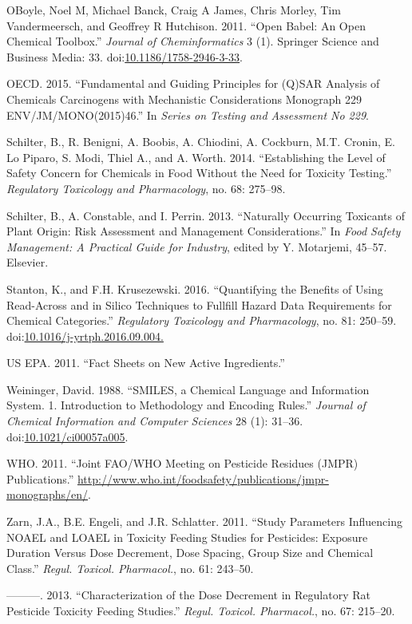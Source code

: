 \documentclass[]{achemso}
\begin{document}
\hypertarget{ref-OBoyle2011}{}
OBoyle, Noel M, Michael Banck, Craig A James, Chris Morley, Tim
Vandermeersch, and Geoffrey R Hutchison. 2011. ``Open Babel: An Open
Chemical Toolbox.'' \emph{Journal of Cheminformatics} 3 (1). Springer
Science and Business Media: 33.
doi:\href{https://doi.org/10.1186/1758-2946-3-33}{10.1186/1758-2946-3-33}.

\hypertarget{ref-OECD2015}{}
OECD. 2015. ``Fundamental and Guiding Principles for (Q)SAR Analysis of
Chemicals Carcinogens with Mechanistic Considerations Monograph 229
ENV/JM/MONO(2015)46.'' In \emph{Series on Testing and Assessment No
229}.

\hypertarget{ref-Schilter2014}{}
Schilter, B., R. Benigni, A. Boobis, A. Chiodini, A. Cockburn, M.T.
Cronin, E. Lo Piparo, S. Modi, Thiel A., and A. Worth. 2014.
``Establishing the Level of Safety Concern for Chemicals in Food Without
the Need for Toxicity Testing.'' \emph{Regulatory Toxicology and
Pharmacology}, no. 68: 275--98.

\hypertarget{ref-Schilter2013}{}
Schilter, B., A. Constable, and I. Perrin. 2013. ``Naturally Occurring
Toxicants of Plant Origin: Risk Assessment and Management
Considerations.'' In \emph{Food Safety Management: A Practical Guide for
Industry}, edited by Y. Motarjemi, 45--57. Elsevier.

\hypertarget{ref-Stanton2016}{}
Stanton, K., and F.H. Krusezewski. 2016. ``Quantifying the Benefits of
Using Read-Across and in Silico Techniques to Fullfill Hazard Data
Requirements for Chemical Categories.'' \emph{Regulatory Toxicology and
Pharmacology}, no. 81: 250--59.
doi:\href{https://doi.org/10.1016/j-yrtph.2016.09.004.}{10.1016/j-yrtph.2016.09.004.}

\hypertarget{ref-EPA2011}{}
US EPA. 2011. ``Fact Sheets on New Active Ingredients.''

\hypertarget{ref-doi:10.1021ux2fci00057a005}{}
Weininger, David. 1988. ``SMILES, a Chemical Language and Information
System. 1. Introduction to Methodology and Encoding Rules.''
\emph{Journal of Chemical Information and Computer Sciences} 28 (1):
31--36.
doi:\href{https://doi.org/10.1021/ci00057a005}{10.1021/ci00057a005}.

\hypertarget{ref-WHO2011}{}
WHO. 2011. ``Joint FAO/WHO Meeting on Pesticide Residues (JMPR)
Publications.''
\url{http://www.who.int/foodsafety/publications/jmpr-monographs/en/}.

\hypertarget{ref-Zarn2011}{}
Zarn, J.A., B.E. Engeli, and J.R. Schlatter. 2011. ``Study Parameters
Influencing NOAEL and LOAEL in Toxicity Feeding Studies for Pesticides:
Exposure Duration Versus Dose Decrement, Dose Spacing, Group Size and
Chemical Class.'' \emph{Regul. Toxicol. Pharmacol.}, no. 61: 243--50.

\hypertarget{ref-Zarn2013}{}
---------. 2013. ``Characterization of the Dose Decrement in Regulatory
Rat Pesticide Toxicity Feeding Studies.'' \emph{Regul. Toxicol.
Pharmacol.}, no. 67: 215--20.
\end{document}
